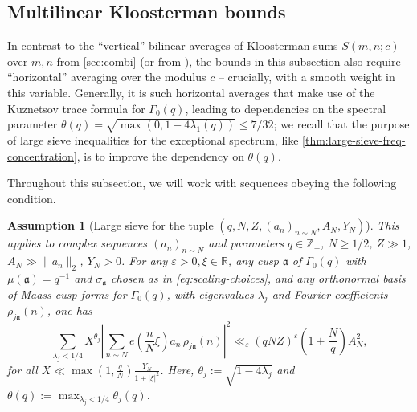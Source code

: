 \documentclass[reqno,11pt]{amsart}
\newtheorem{assumption}[theorem]{Assumption}
\theoremstyle{remark}
\numberwithin{equation}{section}
\newcommand{\Z}{\mathbb{Z}}
\newcommand{\R}{\mathbb{R}}
\newcommand{\ma}{\mathfrak{a}}
\newcommand{\eps}{\varepsilon}
\begin{document}
\subsection{Multilinear Kloosterman bounds} \label{subsec:multilinear-kloosterman}

In contrast to the ``vertical'' bilinear averages of Kloosterman sums $S(m, n; c)$ over $m, n$ from \cref{sec:combi} (or from \cite{kowalski2017bilinear,kerr2023bounds}), the bounds in this subsection also require ``horizontal'' averaging over the modulus $c$ -- crucially, with a smooth weight in this variable. Generally, it is such horizontal averages that make use of the Kuznetsov trace formula for $\Gamma_0(q)$, leading to dependencies on the spectral parameter $\theta(q) = \sqrt{\max(0, 1-4\lambda_1(q))} \le 7/32$; we recall that the purpose of large sieve inequalities for the exceptional spectrum, like \cref{thm:large-sieve-freq-concentration}, is to improve the dependency on $\theta(q)$.

Throughout this subsection, we will work with sequences obeying the following condition.

\begin{assumption}[Large sieve for the tuple $(q, N, Z, (a_n)_{n \sim N}, A_N, Y_N)$] \label{ass:large-sieve}
This applies to complex sequences $(a_n)_{n \sim N}$ and parameters $q \in \Z_+$, $N \ge 1/2$, $Z \gg 1$, $A_N \gg \|a_n\|_2$, $Y_N > 0$. For any $\eps > 0, \xi \in \R$, any cusp $\ma$ of $\Gamma_0(q)$ with $\mu(\ma) = q^{-1}$ and $\sigma_{\ma}$ chosen as in \cref{eq:scaling-choices}, and any orthonormal basis of Maass cusp forms for $\Gamma_0(q)$, with eigenvalues $\lambda_j$ and Fourier coefficients $\rho_{j\ma}(n)$, one has
\begin{equation} \label{eq:large-sieve-rephrased}
    \sum_{\lambda_j < 1/4} X^{\theta_j} \left\vert \sum_{n \sim N} e\left(\frac{n}{N} \xi \right) a_n\, \rho_{j\ma}(n) \right\vert^2 
    \ll_\eps
    (qNZ)^\eps 
    \left(1 + \frac{N}{q}\right) 
     A_N^2,
\end{equation}
for all $X \ll \max\left(1, \frac{q}{N}\right) \frac{Y_N}{1+|\xi|^2}$. Here, $\theta_j := \sqrt{1-4\lambda_j}$ and $\theta(q) := \max_{\lambda_j < 1/4} \theta_j(q)$.
\end{assumption}
\end{document}
